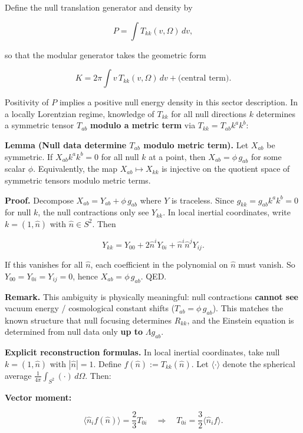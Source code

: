 \documentclass[
]{article}
\begin{document}
Define the null translation generator and density by

\[
P = \int T_{kk}(v,\Omega)\,dv,
\]

so that the modular generator takes the geometric form

\[
K = 2\pi \int v\,T_{kk}(v,\Omega)\,dv + \text{(central term)}.
\]

Positivity of \(P\) implies a positive null energy density in this
sector description. In a locally Lorentzian regime, knowledge of
\(T_{kk}\) for all null directions \(k\) determines a symmetric tensor
\(T_{ab}\) \textbf{modulo a metric term} via
\(T_{kk} = T_{ab} k^a k^b\):

\textbf{Lemma (Null data determine \(T_{ab}\) modulo metric term).} Let
\(X_{ab}\) be symmetric. If \(X_{ab} k^a k^b = 0\) for all null \(k\) at
a point, then \(X_{ab} = \phi \, g_{ab}\) for some scalar \(\phi\).
Equivalently, the map \(X_{ab} \mapsto X_{kk}\) is injective on the
quotient space of symmetric tensors modulo metric terms.

\textbf{Proof.} Decompose \(X_{ab} = Y_{ab} + \phi \, g_{ab}\) where
\(Y\) is traceless. Since \(g_{kk} = g_{ab} k^a k^b = 0\) for null
\(k\), the null contractions only see \(Y_{kk}\). In local inertial
coordinates, write \(k = (1, \hat{n})\) with \(\hat{n} \in S^2\). Then

\[
Y_{kk} = Y_{00} + 2 \hat{n}^i Y_{0i} + \hat{n}^i \hat{n}^j Y_{ij}.
\]

If this vanishes for all \(\hat{n}\), each coefficient in the polynomial
on \(\hat{n}\) must vanish. So \(Y_{00} = Y_{0i} = Y_{ij} = 0\), hence
\(X_{ab} = \phi \, g_{ab}\). QED.

\textbf{Remark.} This ambiguity is physically meaningful: null
contractions \textbf{cannot see} vacuum energy / cosmological constant
shifts (\(T_{ab} = \phi \, g_{ab}\)). This matches the known structure
that null focusing determines \(R_{kk}\), and the Einstein equation is
determined from null data only \textbf{up to} \(\Lambda g_{ab}\).

\textbf{Explicit reconstruction formulas.} In local inertial
coordinates, take null \(k = (1, \hat{n})\) with \(|\hat{n}| = 1\).
Define \(f(\hat{n}) := T_{kk}(\hat{n})\). Let \(\langle \cdot \rangle\)
denote the spherical average
\(\frac{1}{4\pi} \int_{S^2} (\cdot) \, d\Omega\). Then:

\textbf{Vector moment:}

\[
\langle \hat{n}_i f(\hat{n}) \rangle = \frac{2}{3} T_{0i}
\quad \Rightarrow \quad
T_{0i} = \frac{3}{2} \langle \hat{n}_i f \rangle.
\]
\end{document}
